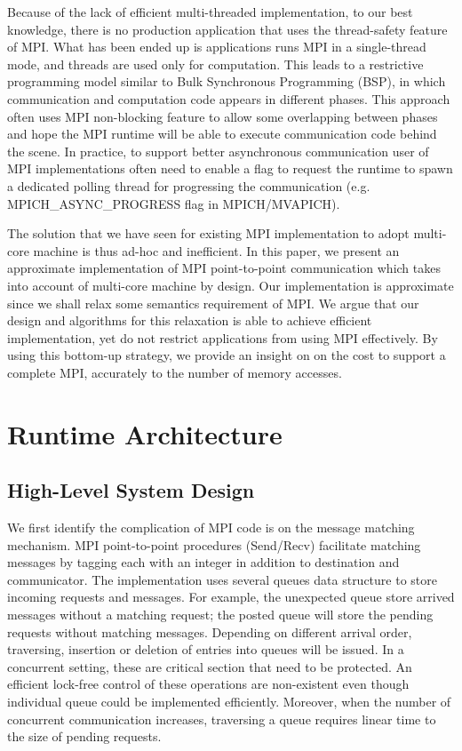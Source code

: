 \documentclass[11pt]{article}
\begin{document}
Because of the lack of efficient multi-threaded implementation, to our best
knowledge, there is no production application that uses the thread-safety
feature of MPI. What has been ended up is applications runs MPI in a
single-thread mode, and threads are used only for computation. This leads to a
restrictive programming model similar to Bulk Synchronous Programming (BSP), in
which communication and computation code appears in different phases. This
approach often uses MPI non-blocking feature to allow some overlapping between
phases and hope the MPI runtime will be able to execute communication code
behind the scene. In practice, to support better asynchronous communication
user of MPI implementations often need to enable a flag to request the runtime
to spawn a dedicated polling thread for progressing the communication (e.g.
MPICH_ASYNC_PROGRESS flag in MPICH/MVAPICH).

The solution that we have seen for existing MPI implementation to adopt
multi-core machine is thus ad-hoc and inefficient. In this
paper, we present an approximate implementation of MPI point-to-point
communication which takes into account of multi-core machine by design. Our
implementation is approximate since we shall relax some semantics requirement
of MPI. We argue that our design and algorithms for this relaxation is able to
achieve efficient implementation, yet do not restrict applications from using
MPI effectively. By using this bottom-up strategy, we provide an insight on 
on the cost to support a complete MPI, accurately to the number of memory
accesses.

\section{Runtime Architecture}
\subsection{High-Level System Design}
We first identify the complication of MPI code is on the message matching
mechanism. MPI point-to-point procedures (Send/Recv) facilitate matching
messages by tagging each with an integer in addition to destination and
communicator. The implementation uses several queues data structure to store
incoming requests and messages. For example, the unexpected queue store arrived
messages without a matching request; the posted queue will store the pending
requests without matching messages. Depending on different arrival order,
traversing, insertion or deletion of entries into queues will be issued. In a
concurrent setting, these are critical section that need to be protected. An
efficient lock-free control of these operations are non-existent even though
individual queue could be implemented efficiently.  Moreover, when the number
of concurrent communication increases, traversing a queue requires linear time
to the size of pending requests.
\end{document}
